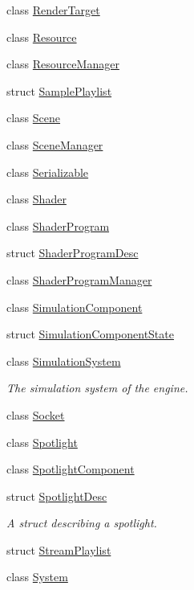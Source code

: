 \begin{DoxyCompactItemize}
class \hyperlink{class_blade_1_1_render_target}{Render\+Target}
\item 
class \hyperlink{class_blade_1_1_resource}{Resource}
\item 
class \hyperlink{class_blade_1_1_resource_manager}{Resource\+Manager}
\item 
struct \hyperlink{struct_blade_1_1_sample_playlist}{Sample\+Playlist}
\item 
class \hyperlink{class_blade_1_1_scene}{Scene}
\item 
class \hyperlink{class_blade_1_1_scene_manager}{Scene\+Manager}
\item 
class \hyperlink{class_blade_1_1_serializable}{Serializable}
\item 
class \hyperlink{class_blade_1_1_shader}{Shader}
\item 
class \hyperlink{class_blade_1_1_shader_program}{Shader\+Program}
\item 
struct \hyperlink{struct_blade_1_1_shader_program_desc}{Shader\+Program\+Desc}
\item 
class \hyperlink{class_blade_1_1_shader_program_manager}{Shader\+Program\+Manager}
\item 
class \hyperlink{class_blade_1_1_simulation_component}{Simulation\+Component}
\item 
struct \hyperlink{struct_blade_1_1_simulation_component_state}{Simulation\+Component\+State}
\item 
class \hyperlink{class_blade_1_1_simulation_system}{Simulation\+System}
\begin{DoxyCompactList}\small\item\em The simulation system of the engine. \end{DoxyCompactList}\item 
class \hyperlink{class_blade_1_1_socket}{Socket}
\item 
class \hyperlink{class_blade_1_1_spotlight}{Spotlight}
\item 
class \hyperlink{class_blade_1_1_spotlight_component}{Spotlight\+Component}
\item 
struct \hyperlink{struct_blade_1_1_spotlight_desc}{Spotlight\+Desc}
\begin{DoxyCompactList}\small\item\em A struct describing a spotlight. \end{DoxyCompactList}\item 
struct \hyperlink{struct_blade_1_1_stream_playlist}{Stream\+Playlist}
\item 
class \hyperlink{class_blade_1_1_system}{System}

\end{DoxyCompactItemize}
